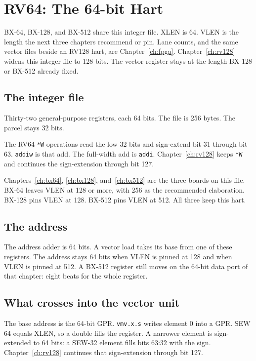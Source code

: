 \chapter{RV64: The 64-bit Hart}
\label{ch:rv64}

BX-64, BX-128, and BX-512 share this integer file. XLEN is 64. VLEN is the length the next three chapters recommend or pin. Lane counts, and the same vector files beside an RV128 hart, are Chapter~\ref{ch:fpga}. Chapter~\ref{ch:rv128} widens this integer file to 128 bits. The vector register stays at the length BX-128 or BX-512 already fixed.

\section{The integer file}

Thirty-two general-purpose registers, each 64 bits. The file is 256 bytes. The parcel stays 32 bits.

The RV64 \texttt{*W} operations read the low 32 bits and sign-extend bit 31 through bit 63. \texttt{addiw} is that add. The full-width add is \texttt{addi}. Chapter~\ref{ch:rv128} keeps \texttt{*W} and continues the sign-extension through bit 127.

Chapters~\ref{ch:bx64}, \ref{ch:bx128}, and~\ref{ch:bx512} are the three boards on this file. BX-64 leaves VLEN at 128 or more, with 256 as the recommended elaboration. BX-128 pins VLEN at 128. BX-512 pins VLEN at 512. All three keep this hart.

\section{The address}

The address adder is 64 bits. A vector load takes its base from one of these registers. The address stays 64 bits when VLEN is pinned at 128 and when VLEN is pinned at 512. A BX-512 register still moves on the 64-bit data port of that chapter: eight beats for the whole register.

\section{What crosses into the vector unit}

The base address is the 64-bit GPR. \texttt{vmv.x.s} writes element 0 into a GPR. SEW 64 equals XLEN, so a double fills the register. A narrower element is sign-extended to 64 bits: a SEW-32 element fills bits 63:32 with the sign. Chapter~\ref{ch:rv128} continues that sign-extension through bit 127.

